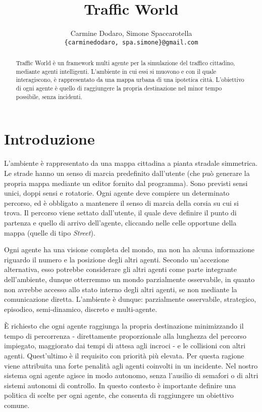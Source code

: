 \documentclass[a4paper,10pt]{article}
\title{Traffic World}
\author{
    Carmine Dodaro, Simone Spaccarotella \\
    \texttt{\{carminedodaro, spa.simone\}@gmail.com}
}
\begin{document}
    \maketitle

    \begin{abstract}
	Traffic World è un framework multi agente per la simulazione del traffico cittadino, mediante agenti
	intelligenti. L'ambiente in cui essi si muovono e con il quale interagiscono, è rappresentato da una mappa
	urbana di una ipotetica città. L'obiettivo di ogni agente è quello di raggiungere la propria destinazione
	nel minor tempo possibile, senza incidenti.
    \end{abstract}

    \section{Introduzione}
	L'ambiente è rappresentato da una mappa cittadina a pianta stradale simmetrica.
	Le strade hanno un senso di marcia predefinito dall'utente (che può generare la propria
	mappa mediante un editor fornito dal programma). Sono previsti sensi unici, doppi sensi
	e rotatorie. Ogni agente deve compiere un determinato percorso, ed è obbligato a mantenere
	il senso di marcia della corsia su cui si trova. Il percorso viene settato dall'utente,
	il quale deve definire il punto di partenza e quello di arrivo dell'agente, cliccando nelle
	celle opportune della mappa (quelle di tipo \emph{Street}).
	
  Ogni agente ha una visione completa del mondo, ma non ha alcuna informazione riguardo
  il numero e la posizione degli altri agenti. Secondo un'accezione alternativa, esso potrebbe considerare
  gli altri agenti come parte integrante dell'ambiente, dunque otterremmo un mondo parzialmente osservabile,
  in quanto non avrebbe accesso allo stato interno degli altri agenti, se non mediante la comunicazione diretta.
  L'ambiente è dunque: parzialmente osservabile, strategico, episodico, semi-dinamico, discreto e multi-agente.
  
	È richiesto che ogni agente raggiunga la propria destinazione minimizzando il tempo
	di percorrenza - direttamente proporzionale alla lunghezza del percorso impiegato,
	maggiorato dai tempi di attesa agli incroci - e le collisioni con altri agenti.
	Quest'ultimo è il requisito con priorità più elevata. Per questa ragione
	viene attribuita una forte penalità agli agenti coinvolti in un incidente. Nel nostro
	sistema ogni agente agisce in modo autonomo, senza l'ausilio di semafori o di
	altri sistemi autonomi di controllo. In questo contesto è importante
	definire una politica di scelte per ogni agente, che consenta di raggiungere un
	obiettivo comune.
	
\end{document}
